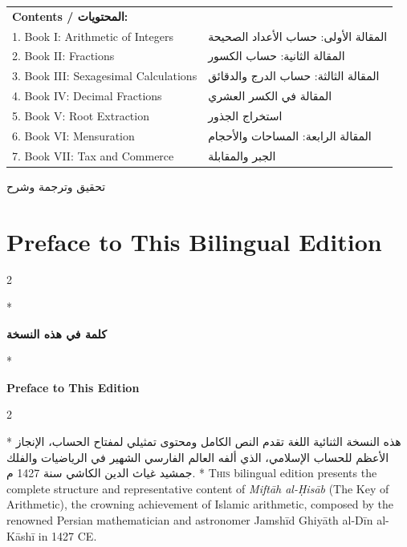\documentclass[11pt,a4paper]{article}
\newcommand{\ar}[1]{\arabicfont\beginR #1\endR}
\newenvironment{bilingual}{%
  \vspace{0.3em}%
  \begin{paracol}{2}%
}{%
  \end{paracol}%
  \vspace{0.3em}%
}
\begin{document}
\begin{center}
\begin{tabular}{p{}p{}}
\textbf{Contents / المحتويات:} & \\
1. Book I: Arithmetic of Integers & \ar{المقالة الأولى: حساب الأعداد الصحيحة} \\
2. Book II: Fractions & \ar{المقالة الثانية: حساب الكسور} \\
3. Book III: Sexagesimal Calculations & \ar{المقالة الثالثة: حساب الدرج والدقائق} \\
4. Book IV: Decimal Fractions & \ar{المقالة في الكسر العشري} \\
5. Book V: Root Extraction & \ar{استخراج الجذور} \\
6. Book VI: Mensuration & \ar{المقالة الرابعة: المساحات والأحجام} \\
7. Book VII: Tax and Commerce & \ar{الجبر والمقابلة} \\
\end{tabular}

\vspace{0.8cm}

{\footnotesize\ar{تحقيق وترجمة وشرح}}\\[0.2cm]
\end{center}
\clearpage

\tableofcontents
\clearpage

\section*{Preface to This Bilingual Edition}

\begin{bilingual}
\switchcolumn[0]*
\begin{center}
\textbf{\color{chapcolor}\ar{كلمة في هذه النسخة}}
\end{center}
\switchcolumn[1]*
\begin{center}
\textbf{\color{chapcolor}Preface to This Edition}
\end{center}
\end{bilingual}

\begin{bilingual}
\switchcolumn[0]*
\ar{هذه النسخة الثنائية اللغة تقدم النص الكامل ومحتوى تمثيلي لمفتاح الحساب، الإنجاز الأعظم للحساب الإسلامي، الذي ألفه العالم الفارسي الشهير في الرياضيات والفلك جمشيد غياث الدين الكاشي سنة 1427 م.}
\switchcolumn[1]*
\lettrine[lines=3, nindent=0em, findent=3pt]{\color{chapcolor}T}{his}
bilingual edition presents the complete structure and representative content of
\textit{Mift\=ah al-\d{H}is\=ab} (The Key of Arithmetic), the crowning
achievement of Islamic arithmetic, composed by the renowned Persian
mathematician and astronomer Jamsh\=id Ghiy\=ath al-D\=in al-K\=ash\=i in 1427 CE.
\end{bilingual}
\end{document}
